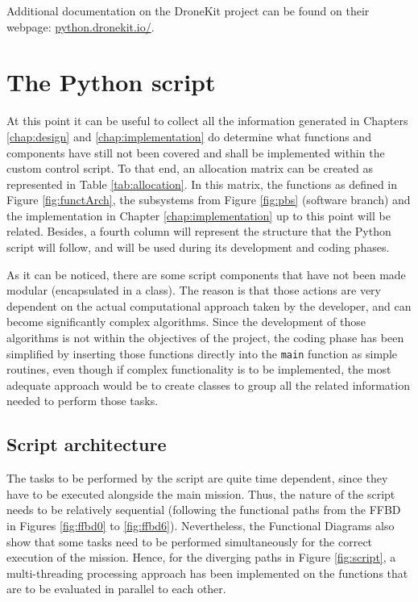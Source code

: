 Additional documentation on the DroneKit project can be found on their webpage: \url{python.dronekit.io/}.


\section{The Python script}	\label{sec:script}

At this point it can be useful to collect all the information generated in Chapters \ref{chap:design} and \ref{chap:implementation} do determine what functions and components have still not been covered and shall be implemented within the custom control script.
To that end, an allocation matrix can be created as represented in Table \ref{tab:allocation}.
In this matrix, the functions as defined in Figure \ref{fig:functArch}, the subsystems from Figure \ref{fig:pbs} (software branch) and the implementation in Chapter \ref{chap:implementation} up to this point will be related.
Besides, a fourth column will represent the structure that the Python script will follow, and will be used during its development and coding phases.



As it can be noticed, there are some script components that have not been made modular (encapsulated in a class).
The reason is that those actions are very dependent on the actual computational approach taken by the developer, and can become significantly complex algorithms.
Since the development of those algorithms is not within the objectives of the project, the coding phase has been simplified by inserting those functions directly into the \texttt{main} function as simple routines, even though if complex functionality is to be implemented, the most adequate approach would be to create classes to group all the related information needed to perform those tasks.

\subsection{Script architecture}

The tasks to be performed by the script are quite time dependent, since they have to be executed alongside the main mission.
Thus, the nature of the script needs to be relatively sequential (following the functional paths from the FFBD in Figures \ref{fig:ffbd0} to \ref{fig:ffbd6}).
Nevertheless, the Functional Diagrams also show that some tasks need to be performed simultaneously for the correct execution of the mission.
Hence, for the diverging paths in Figure \ref{fig:script}, a multi-threading processing approach has been implemented on the functions that are to be evaluated in parallel to each other.

